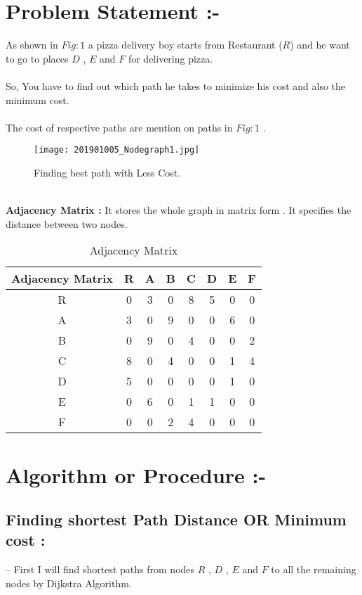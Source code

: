 \documentclass{article}
\begin{document}
\newpage
\section{Problem Statement :- }
As shown in $Fig:1$ a pizza delivery boy starts from Restaurant ($R$) and he want to go to places $D$ , $E$ and $F$ for delivering pizza.\\\\
So, You have to find out which path he takes to minimize his cost and also the minimum cost.\\ \\
The cost of respective paths are mention on paths in $Fig:1$ .\\
\begin{figure}[h!]
    \centering
    \texttt{[image: 201901005\_Nodegraph1.jpg]}
    \caption{Finding best path with Less Cost.}
    \label{fig:Nodegraph1}
\end{figure}\\
\textbf{Adjacency Matrix : }It stores the whole graph in matrix form . It specifies the distance between two nodes.\\
\begin{table}[h!]
    \centering
    \begin{tabular}{|c|c|c|c|c|c|c|c|}
        \hline
        Adjacency Matrix & R & A & B & C & D & E & F \\
        \hline
        R & 0 & 3 & 0 & 8 & 5 & 0 & 0 \\
        A & 3 & 0 & 9 & 0 & 0 & 6 & 0 \\
        B & 0 & 9 & 0 & 4 & 0 & 0 & 2 \\ 
        C & 8 & 0 & 4 & 0 & 0 & 1 & 4 \\
        D & 5 & 0 & 0 & 0 & 0 & 1 & 0 \\
        E & 0 & 6 & 0 & 1 & 1 & 0 & 0 \\
        F & 0 & 0 & 2 & 4 & 0 & 0 & 0 \\  
        \hline
    \end{tabular}
    \caption{Adjacency Matrix}
    \label{tab:my_label}
\end{table}
\newpage
\section{Algorithm or Procedure :- }

    \subsection[]{Finding shortest Path Distance OR Minimum cost :}
        -- First I will find shortest paths from nodes $R$ , $D$ , $E$ and $F$ to all the remaining nodes by Dijkstra Algorithm.\\
\end{document}
